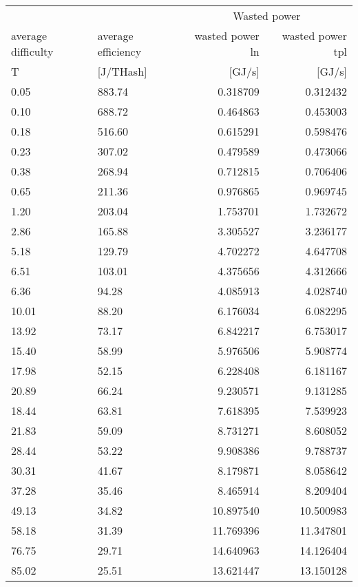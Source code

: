 \begin{tabular}{@{}llrr@{}}
\toprule
 &  & \multicolumn{2}{c}{Wasted power} \\
\cmidrule(lr){3-4} 
average difficulty & average efficiency & wasted power ln & wasted power tpl\\
T & [J/THash] & [GJ/s] & [GJ/s]\\
\cmidrule(lr){1-4}
0.05 & 883.74 & 0.318709 & 0.312432 \\
0.10 & 688.72 & 0.464863 & 0.453003 \\
0.18 & 516.60 & 0.615291 & 0.598476 \\
0.23 & 307.02 & 0.479589 & 0.473066 \\
0.38 & 268.94 & 0.712815 & 0.706406 \\
0.65 & 211.36 & 0.976865 & 0.969745 \\
1.20 & 203.04 & 1.753701 & 1.732672 \\
2.86 & 165.88 & 3.305527 & 3.236177 \\
5.18 & 129.79 & 4.702272 & 4.647708 \\
6.51 & 103.01 & 4.375656 & 4.312666 \\
6.36 & 94.28 & 4.085913 & 4.028740 \\
10.01 & 88.20 & 6.176034 & 6.082295 \\
13.92 & 73.17 & 6.842217 & 6.753017 \\
15.40 & 58.99 & 5.976506 & 5.908774 \\
17.98 & 52.15 & 6.228408 & 6.181167 \\
20.89 & 66.24 & 9.230571 & 9.131285 \\
18.44 & 63.81 & 7.618395 & 7.539923 \\
21.83 & 59.09 & 8.731271 & 8.608052 \\
28.44 & 53.22 & 9.908386 & 9.788737 \\
30.31 & 41.67 & 8.179871 & 8.058642 \\
37.28 & 35.46 & 8.465914 & 8.209404 \\
49.13 & 34.82 & 10.897540 & 10.500983 \\
58.18 & 31.39 & 11.769396 & 11.347801 \\
76.75 & 29.71 & 14.640963 & 14.126404 \\
85.02 & 25.51 & 13.621447 & 13.150128 \\
\bottomrule
\end{tabular}
